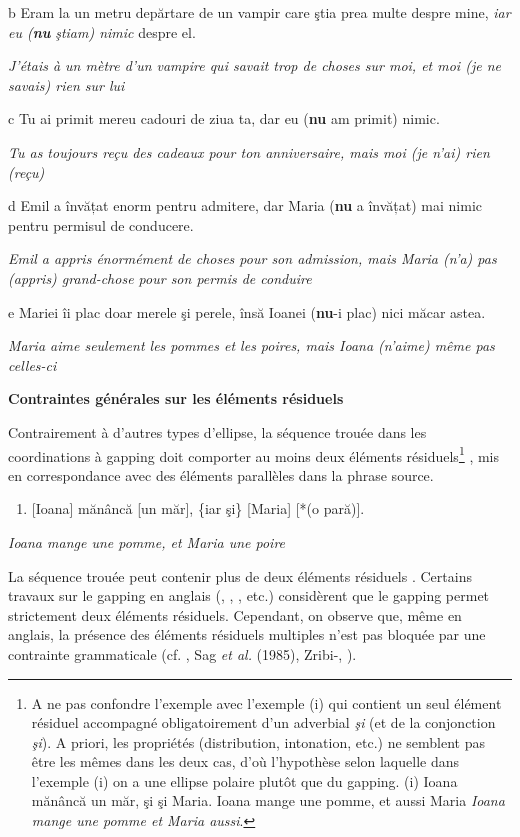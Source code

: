   b  Eram la un metru depărtare de un vampir care ştia prea multe despre mine, \emph{\textup{iar eu (}}\emph{\textbf{\textup{nu}}}\emph{\textup{ ştiam) nimic}} despre el.

{\itshape
J'étais à un mètre d'un vampire qui savait trop de choses sur moi, et moi (je ne savais) rien sur lui} 

  c  Tu ai primit mereu cadouri de ziua ta, dar eu (\textbf{nu} am primit) nimic.

{\itshape
Tu as toujours reçu des cadeaux pour ton anniversaire, mais moi (je n'ai) rien (reçu)}

  d  Emil a învățat enorm pentru admitere, dar Maria (\textbf{nu} a învățat) mai nimic pentru permisul de conducere.

{\itshape
Emil a appris énormément de choses pour son admission, mais Maria (n'a) pas (appris) grand-chose pour son permis de conduire} 

  e  Mariei îi plac doar merele şi perele, însă Ioanei (\textbf{nu}-i plac) nici măcar astea.

\textit{Maria aime seulement les pommes et les poires, mais Ioana (n'aime) même pas celles-ci} 

{\bfseries
\label{bkm:Ref299907500}Contraintes générales sur les éléments résiduels}

Contrairement à d'autres types d'ellipse, la séquence trouée dans les coordinations à gapping doit comporter au moins deux éléments résiduels\footnote{A ne pas confondre l'exemple  avec l'exemple (i) qui contient un seul élément résiduel accompagné obligatoirement d'un adverbial \textit{şi} (et de la conjonction \textit{şi}). A priori, les propriétés (distribution, intonation, etc.) ne semblent pas être les mêmes dans les deux cas, d'où l'hypothèse selon laquelle dans l'exemple (i) on a une ellipse polaire plutôt que du gapping.
(i)  Ioana  mănâncă  un  măr,  şi  şi  Maria.
  Ioana  mange  une  pomme,  et  aussi  Maria
\textit{Ioana mange une pomme et Maria aussi}.} , mis en correspondance avec des éléments parallèles dans la phrase source.  


\begin{enumerate}
\item \label{bkm:Ref298090742}[Ioana] mănâncă [un măr], \{iar {\textbar} şi\} [Maria] [*(o pară)].


\end{enumerate}
{\itshape
Ioana mange une pomme, et Maria une poire } 

La séquence trouée peut contenir plus de deux éléments résiduels . Certains travaux sur le gapping en anglais (\citet{Jackendoff1971}, \citet{Kuno1976}, \citet{Haspelmath2007}, etc.) considèrent que le gapping permet strictement deux éléments résiduels. Cependant, on observe que, même en anglais, la présence des éléments résiduels multiples n'est pas bloquée par une contrainte grammaticale (cf. \citet{Kuno1976}, Sag \textit{et al.} (1985), Zribi-\citet{Hertz1986}, \citet{Steedman1990}).


